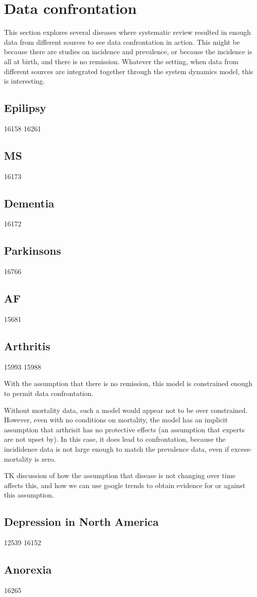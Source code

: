 \section{Data confrontation}
This section explores several diseases where systematic review
resulted in enough data from different sources to see data
confrontation in action.  This might be because there are studies on
incidence and prevalence, or because the incidence is all at birth,
and there is no remission.  Whatever the setting, when data from
different sources are integrated together through the system dynamics
model, this is interesting.

\subsection{Epilipsy}
16158
16261

\subsection{MS}
16173

\subsection{Dementia}
16172

\subsection{Parkinsons}
16766

\subsection{AF}
15681

\subsection{Arthritis}
15993
15988

With the assumption that there is no remission, this model is
constrained enough to permit data confrontation.

Without mortality data, such a model would appear not to be over
constrained.  However, even with no conditions on mortality, the model
has an implicit assumption that arthrisit has no protective effects
(an assumption that experts are not upset by).  In this case, it does
lead to confrontation, because the incididence data is not large
enough to match the prevalence data, even if excess-mortality is zero.

TK discussion of how the assumption that disease is not changing over
time affects this, and how we can use google trends to obtain evidence
for or against this assumption.


\subsection{Depression in North America}
12539 
16152


\subsection{Anorexia}
16265

